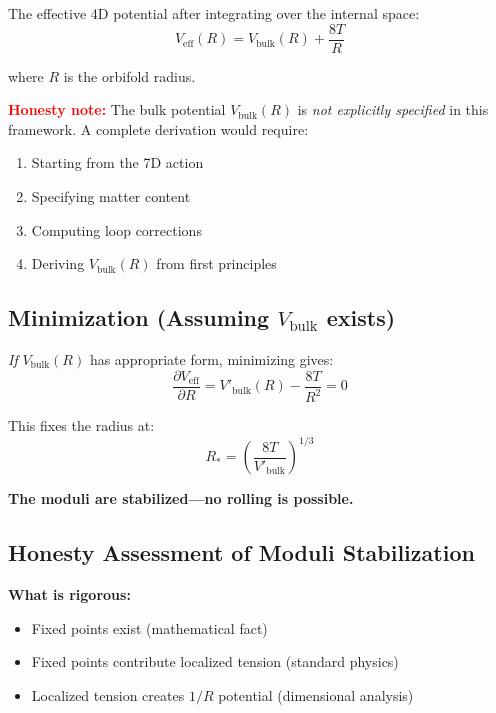 \documentclass[12pt,a4paper]{article}
\begin{document}
The effective 4D potential after integrating over the internal space:
\begin{equation}
V_{\text{eff}}(R) = V_{\text{bulk}}(R) + \frac{8T}{R}
\end{equation}

where $R$ is the orbifold radius.

\textcolor{red}{\textbf{Honesty note:}} The bulk potential $V_{\text{bulk}}(R)$ is \textit{not explicitly specified} in this framework. A complete derivation would require:
\begin{enumerate}
    \item Starting from the 7D action
    \item Specifying matter content
    \item Computing loop corrections
    \item Deriving $V_{\text{bulk}}(R)$ from first principles
\end{enumerate}

\subsection{Minimization (Assuming $V_{\text{bulk}}$ exists)}

\textit{If} $V_{\text{bulk}}(R)$ has appropriate form, minimizing gives:
\begin{equation}
\frac{\partial V_{\text{eff}}}{\partial R} = V'_{\text{bulk}}(R) - \frac{8T}{R^2} = 0
\end{equation}

This fixes the radius at:
\begin{equation}
R_* = \left(\frac{8T}{V'_{\text{bulk}}}\right)^{1/3}
\end{equation}

\textbf{The moduli are stabilized---no rolling is possible.}

\subsection{Honesty Assessment of Moduli Stabilization}

\textbf{What is rigorous:}
\begin{itemize}
    \item Fixed points exist (mathematical fact)
    \item Fixed points contribute localized tension (standard physics)
    \item Localized tension creates $1/R$ potential (dimensional analysis)
\end{itemize}
\end{document}
